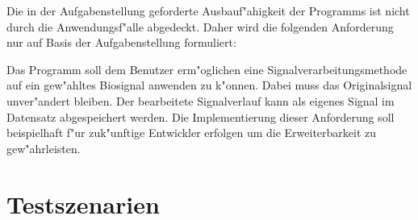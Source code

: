Die in der Aufgabenstellung geforderte Ausbauf"ahigkeit der Programms ist nicht durch die Anwendungsf"alle abgedeckt.
Daher wird die folgenden Anforderung nur auf Basis der Aufgabenstellung formuliert:
\begin{enumerate}[resume]
	 Das Programm soll dem Benutzer erm"oglichen eine Signalverarbeitungsmethode auf ein gew"ahltes Biosignal anwenden zu k"onnen.
							Dabei muss das Originalsignal unver"andert bleiben.
							Der bearbeitete Signalverlauf kann als eigenes Signal im Datensatz abgespeichert werden.
							Die Implementierung dieser Anforderung soll beispielhaft f"ur zuk"unftige Entwickler erfolgen um die Erweiterbarkeit zu gew"ahrleisten.
\end{enumerate}

\section{Testszenarien}


